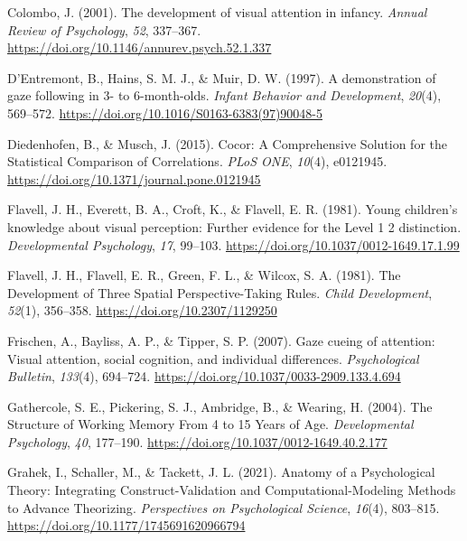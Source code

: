 \documentclass[
  man,floatsintext]{apa6}
\newlength{\cslhangindent}
\newlength{\cslentryspacingunit} %
\newenvironment{CSLReferences}[2] %
 {%
  \setlength{\parindent}{0pt}
  \ifodd #1
  \let\oldpar\par
  \def\par{\hangindent=\cslhangindent\oldpar}
  \fi
  \setlength{\parskip}{#2\cslentryspacingunit}
 }%
 {}
\begin{document}
\begin{CSLReferences}{1}{0}
\leavevmode{}%
Colombo, J. (2001). The development of visual attention in infancy. \emph{Annual Review of Psychology}, \emph{52}, 337--367. \url{https://doi.org/10.1146/annurev.psych.52.1.337}

\leavevmode{}%
D'Entremont, B., Hains, S. M. J., \& Muir, D. W. (1997). A demonstration of gaze following in 3- to 6-month-olds. \emph{Infant Behavior and Development}, \emph{20}(4), 569--572. \url{https://doi.org/10.1016/S0163-6383(97)90048-5}

\leavevmode{}%
Diedenhofen, B., \& Musch, J. (2015). Cocor: {A Comprehensive Solution} for the {Statistical Comparison} of {Correlations}. \emph{PLoS ONE}, \emph{10}(4), e0121945. \url{https://doi.org/10.1371/journal.pone.0121945}

\leavevmode{}%
Flavell, J. H., Everett, B. A., Croft, K., \& Flavell, E. R. (1981). Young children's knowledge about visual perception: {Further} evidence for the {Level} 1 2 distinction. \emph{Developmental Psychology}, \emph{17}, 99--103. \url{https://doi.org/10.1037/0012-1649.17.1.99}

\leavevmode{}%
Flavell, J. H., Flavell, E. R., Green, F. L., \& Wilcox, S. A. (1981). The {Development} of {Three Spatial Perspective-Taking Rules}. \emph{Child Development}, \emph{52}(1), 356--358. \url{https://doi.org/10.2307/1129250}

\leavevmode{}%
Frischen, A., Bayliss, A. P., \& Tipper, S. P. (2007). Gaze cueing of attention: {Visual} attention, social cognition, and individual differences. \emph{Psychological Bulletin}, \emph{133}(4), 694--724. \url{https://doi.org/10.1037/0033-2909.133.4.694}

\leavevmode{}%
Gathercole, S. E., Pickering, S. J., Ambridge, B., \& Wearing, H. (2004). The {Structure} of {Working Memory From} 4 to 15 {Years} of {Age}. \emph{Developmental Psychology}, \emph{40}, 177--190. \url{https://doi.org/10.1037/0012-1649.40.2.177}

\leavevmode{}%
Grahek, I., Schaller, M., \& Tackett, J. L. (2021). Anatomy of a {Psychological Theory}: {Integrating Construct-Validation} and {Computational-Modeling Methods} to {Advance Theorizing}. \emph{Perspectives on Psychological Science}, \emph{16}(4), 803--815. \url{https://doi.org/10.1177/1745691620966794}


\end{CSLReferences}
\end{document}
